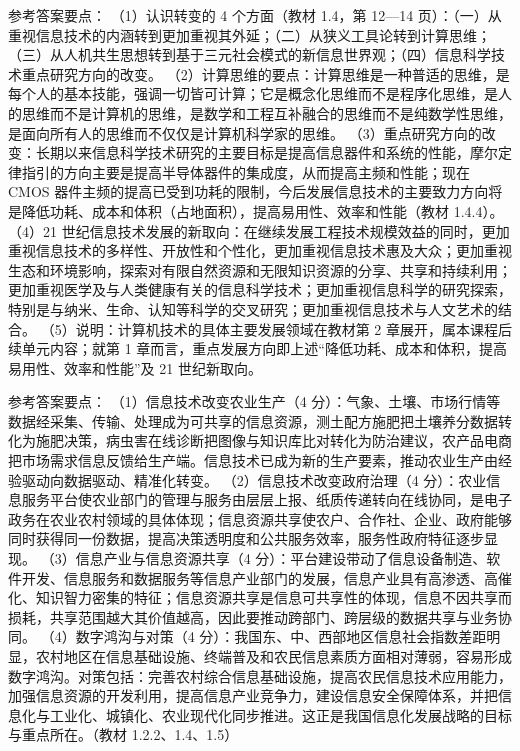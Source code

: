 \documentclass[a4paper,11pt]{article}
\begin{document}
\q 参考答案要点：
（1）认识转变的 4 个方面（教材 1.4，第 12—14 页）：（一）从重视信息技术的内涵转到更加重视其外延；（二）从狭义工具论转到计算思维；（三）从人机共生思想转到基于三元社会模式的新信息世界观；（四）信息科学技术重点研究方向的改变。
（2）计算思维的要点：计算思维是一种普适的思维，是每个人的基本技能，强调一切皆可计算；它是概念化思维而不是程序化思维，是人的思维而不是计算机的思维，是数学和工程互补融合的思维而不是纯数学性思维，是面向所有人的思维而不仅仅是计算机科学家的思维。
（3）重点研究方向的改变：长期以来信息科学技术研究的主要目标是提高信息器件和系统的性能，摩尔定律指引的方向主要是提高半导体器件的集成度，从而提高主频和性能；现在 CMOS 器件主频的提高已受到功耗的限制，今后发展信息技术的主要致力方向将是降低功耗、成本和体积（占地面积），提高易用性、效率和性能（教材 1.4.4）。
（4）21 世纪信息技术发展的新取向：在继续发展工程技术规模效益的同时，更加重视信息技术的多样性、开放性和个性化，更加重视信息技术惠及大众；更加重视生态和环境影响，探索对有限自然资源和无限知识资源的分享、共享和持续利用；更加重视医学及与人类健康有关的信息科学技术；更加重视信息科学的研究探索，特别是与纳米、生命、认知等科学的交叉研究；更加重视信息技术与人文艺术的结合。
（5）说明：计算机技术的具体主要发展领域在教材第 2 章展开，属本课程后续单元内容；就第 1 章而言，重点发展方向即上述“降低功耗、成本和体积，提高易用性、效率和性能”及 21 世纪新取向。


\q 参考答案要点：
（1）信息技术改变农业生产（4 分）：气象、土壤、市场行情等数据经采集、传输、处理成为可共享的信息资源，测土配方施肥把土壤养分数据转化为施肥决策，病虫害在线诊断把图像与知识库比对转化为防治建议，农产品电商把市场需求信息反馈给生产端。信息技术已成为新的生产要素，推动农业生产由经验驱动向数据驱动、精准化转变。
（2）信息技术改变政府治理（4 分）：农业信息服务平台使农业部门的管理与服务由层层上报、纸质传递转向在线协同，是电子政务在农业农村领域的具体体现；信息资源共享使农户、合作社、企业、政府能够同时获得同一份数据，提高决策透明度和公共服务效率，服务性政府特征逐步显现。
（3）信息产业与信息资源共享（4 分）：平台建设带动了信息设备制造、软件开发、信息服务和数据服务等信息产业部门的发展，信息产业具有高渗透、高催化、知识智力密集的特征；信息资源共享是信息可共享性的体现，信息不因共享而损耗，共享范围越大其价值越高，因此要推动跨部门、跨层级的数据共享与业务协同。
（4）数字鸿沟与对策（4 分）：我国东、中、西部地区信息社会指数差距明显，农村地区在信息基础设施、终端普及和农民信息素质方面相对薄弱，容易形成数字鸿沟。对策包括：完善农村综合信息基础设施，提高农民信息技术应用能力，加强信息资源的开发利用，提高信息产业竞争力，建设信息安全保障体系，并把信息化与工业化、城镇化、农业现代化同步推进。这正是我国信息化发展战略的目标与重点所在。（教材 1.2.2、1.4、1.5）
\end{document}
